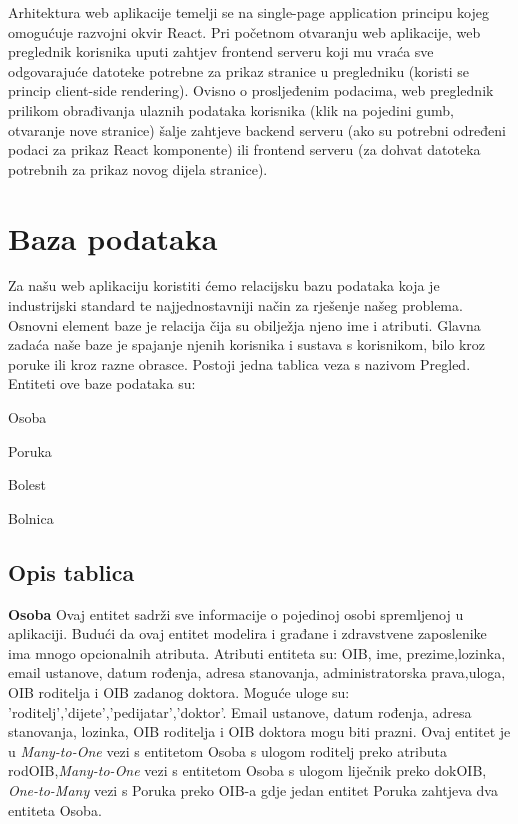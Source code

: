 		 
		 Arhitektura web aplikacije temelji se na single-page application principu kojeg omogućuje razvojni okvir React. Pri početnom otvaranju web aplikacije, web preglednik korisnika uputi zahtjev frontend serveru koji mu vraća sve odgovarajuće datoteke potrebne za prikaz stranice u pregledniku (koristi se princip client-side rendering). Ovisno o prosljeđenim podacima, web preglednik prilikom obrađivanja ulaznih podataka korisnika (klik na pojedini gumb, otvaranje nove stranice) šalje zahtjeve backend serveru (ako su potrebni određeni podaci za prikaz React komponente) ili frontend serveru (za dohvat datoteka potrebnih za prikaz novog dijela stranice).
		 
		 
		  

	
		

		

				
		\section{Baza podataka}
			
		
		Za našu web aplikaciju koristiti ćemo relacijsku bazu podataka koja je industrijski standard te najjednostavniji način za rješenje našeg problema. Osnovni element baze je relacija čija su obilježja njeno ime i atributi. Glavna zadaća naše baze je spajanje njenih korisnika i sustava s korisnikom, bilo kroz poruke ili kroz razne obrasce. Postoji jedna tablica veza s nazivom Pregled.
		Entiteti ove baze podataka su:
		
			\begin{packed_item}
				\item Osoba
				\item Poruka
				\item Bolest
				\item Bolnica
			\end{packed_item}
		
		
			\subsection{Opis tablica}
				
				
				\textbf{Osoba} Ovaj entitet sadrži sve informacije o pojedinoj osobi spremljenoj u aplikaciji. Budući da ovaj entitet modelira i građane i zdravstvene zaposlenike ima mnogo opcionalnih atributa. Atributi entiteta su: OIB, ime, prezime,lozinka, email ustanove, datum rođenja, adresa stanovanja, administratorska prava,uloga, OIB roditelja i OIB zadanog doktora. Moguće uloge su: 'roditelj','dijete','pedijatar','doktor'. Email ustanove, datum rođenja, adresa stanovanja, lozinka, OIB roditelja i OIB doktora mogu biti prazni. Ovaj entitet je u \textit{Many-to-One} vezi s entitetom Osoba s ulogom roditelj preko atributa rodOIB,\textit{Many-to-One} vezi s entitetom Osoba s ulogom liječnik preko dokOIB, \textit{One-to-Many} vezi s Poruka preko OIB-a gdje jedan entitet Poruka zahtjeva dva entiteta Osoba.
				
